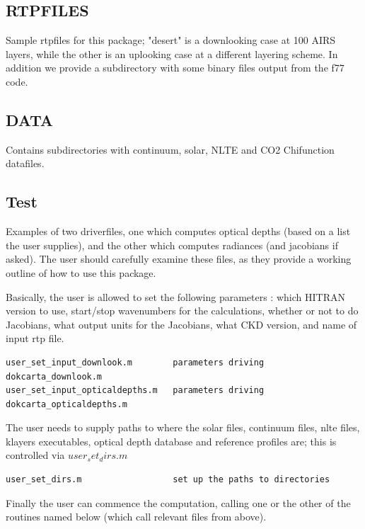 \documentclass[11pt]{article}
\begin{document}
\subsection{RTPFILES}
\label{sec-8-6}

Sample rtpfiles for this package; "desert" is a downlooking case at 100
AIRS layers, while the other is an uplooking case at a different
layering scheme. In addition we provide a subdirectory with some binary
files output from the f77 code.

\subsection{DATA}
\label{sec-8-7}

Contains subdirectories with continuum, solar, NLTE and CO2 Chifunction
datafiles.

\subsection{Test}
\label{sec-8-8}

Examples of two driverfiles, one which computes optical depths (based on
a list the user supplies), and the other which computes radiances (and
jacobians if asked). The user should carefully examine these files, as
they provide a working outline of how to use this package.

Basically, the user is allowed to set the following parameters : which
HITRAN version to use, start/stop wavenumbers for the calculations,
whether or not to do Jacobians, what output units for the Jacobians,
what CKD version, and name of input rtp file.

\begin{verbatim}
user_set_input_downlook.m        parameters driving dokcarta_downlook.m
user_set_input_opticaldepths.m   parameters driving dokcarta_opticaldepths.m
\end{verbatim}

The user needs to supply paths to where the solar files, continuum
files, nlte files, klayers executables, optical depth database and
reference profiles are; this is controlled via $user_set_dirs.m$

\begin{verbatim}
user_set_dirs.m                  set up the paths to directories
\end{verbatim}

Finally the user can commence the computation, calling one or the other
of the routines named below (which call relevant files from above).
\end{document}
